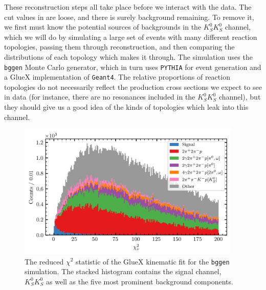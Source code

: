 These reconstruction steps all take place before we interact with the data. The cut values in  are loose, and there is surely background remaining. To remove it, we first must know the potential sources of backgrounds in the $K_S^0K_S^0$ channel, which we will do by simulating a large set of events with many different reaction topologies, passing them through reconstruction, and then comparing the distributions of each topology which makes it through. The simulation uses the \texttt{bggen} Monte Carlo generator, which in turn uses \texttt{PYTHIA}\cite{bierlich_comprehensive_2022} for event generation and a GlueX implementation of \texttt{Geant4}\cite{allison_geant4_2006,allison_recent_2016,agostinelli_geant4simulation_2003}. The relative proportions of reaction topologies do not necessarily reflect the production cross sections we expect to see in data (for instance, there are no resonances included in the $K_S^0K_S^0$ channel), but they should give us a good idea of the kinds of topologies which leak into this channel.

\begin{figure}
  \begin{center}
    \includegraphics[width=0.95\textwidth]{figures/bggen_chisqdof.png}
  \end{center}
  \caption{The reduced $\chi^2$ statistic of the GlueX kinematic fit for the \texttt{bggen} simulation. The stacked histogram contains the signal channel, $K_S^0K_S^0$ as well as the five most prominent background components.}\label{fig:bggen-chisqdof}
\end{figure}


